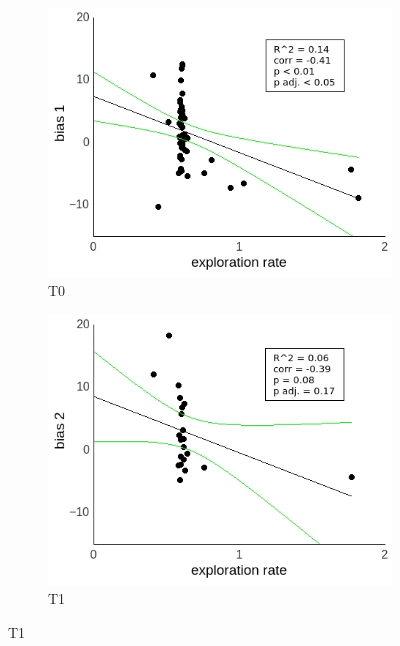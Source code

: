 \documentclass[a4paper]{scrreprt}
\begin{document}
\begin{figure}
\centering
\begin{subfigure}[b]{0.49\textwidth}
        \includegraphics[width=\textwidth]{figs/sec3/temp/temp_diff_1_mod2dat.jpeg}
        \caption{T0}
    \end{subfigure}
    \begin{subfigure}[b]{0.49\textwidth}
        \includegraphics[width=\textwidth]{figs/sec3/temp/temp_diff_2_mod2dat.jpeg}
        \caption{T1}
    \end{subfigure}


\end{figure}
\end{document}
